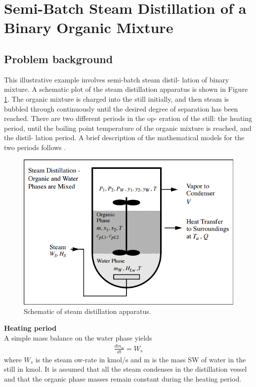 \documentclass[12pt]{report}
\begin{document}
\section{Semi-Batch Steam Distillation of a Binary Organic Mixture}
\subsection{Problem background}
This illustrative example involves semi-batch steam distil- lation of binary mixture. A schematic plot of the steam distillation apparatus is shown in Figure \ref{SD}. The organic mixture is charged into the still initially, and then steam is bubbled through continuously until the desired degree of separation has been reached. There are two different periods in the op- eration of the still: the heating period, until the boiling point temperature of the organic mixture is reached, and the distil- lation period. A brief description of the mathematical models for the two periods follows \cite{PHD}.

\begin{figure}
\centering
\includegraphics[width=0.8\linewidth]{SD}
\caption{Schematic of steam distillation apparatus.}
\label{SD}
\end{figure}

\textbf{Heating period} \\
A simple mass balance on the water phase yields
\begin{gather*}
\frac{dm_w}{dt} = W_s 
\end{gather*}
where $W_s$ is the steam  ow-rate in kmol/s and m is the mass SW
of water in the still in kmol. It is assumed that all the steam condenses in the distillation vessel and that the organic phase masses remain constant during the heating period.
\end{document}
